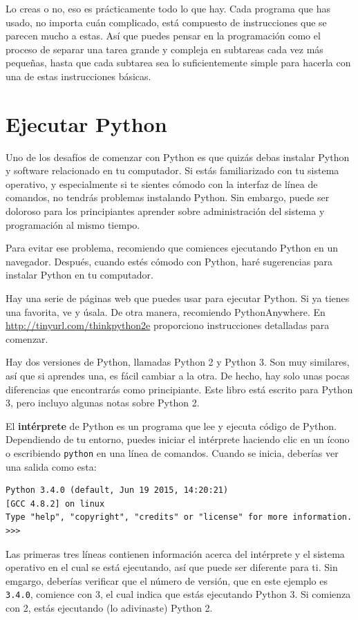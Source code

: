 \documentclass[10pt]{book}
\begin{document}
Lo creas o no, eso es prácticamente todo lo que hay.  Cada
programa que has usado, no importa cuán complicado, está compuesto de
instrucciones que se parecen mucho a estas.  Así que puedes pensar en
la programación como el proceso de separar una tarea grande y compleja en
subtareas cada vez más pequeñas, hasta que cada subtarea sea lo suficientemente
simple para hacerla con una de estas instrucciones básicas.


\section{Ejecutar Python}

Uno de los desafíos de comenzar con Python es que quizás debas
instalar Python y software relacionado en tu computador.
Si estás familiarizado con tu sistema operativo, y especialmente
si te sientes cómodo con la interfaz de línea de comandos, no tendrás
problemas instalando Python.  Sin embargo, puede ser doloroso para
los principiantes aprender sobre administración del sistema y programación al
mismo tiempo.

Para evitar ese problema, recomiendo que comiences ejecutando Python
en un navegador.  Después, cuando estés cómodo con Python, haré
sugerencias para instalar Python en tu computador.

Hay una serie de páginas web que puedes usar para ejecutar Python.  Si ya
tienes una favorita, ve y úsala.  De otra manera, recomiendo
PythonAnywhere.  En \url{http://tinyurl.com/thinkpython2e}
proporciono instrucciones detalladas para comenzar.

Hay dos versiones de Python, llamadas Python 2 y Python 3.
Son muy similares, así que si aprendes una, es fácil cambiar
a la otra.  De hecho, hay solo unas pocas diferencias que encontrarás
como principiante.
Este libro está escrito para Python 3, pero incluyo algunas notas
sobre Python 2.

El {\bf intérprete} de Python es un programa que lee y ejecuta
código de Python.  Dependiendo de tu entorno, puedes iniciar el intérprete
haciendo clic en un ícono o escribiendo {\tt python} en una
línea de comandos.
Cuando se inicia, deberías ver una salida como esta:

\begin{verbatim}
Python 3.4.0 (default, Jun 19 2015, 14:20:21)
[GCC 4.8.2] on linux
Type "help", "copyright", "credits" or "license" for more information.
>>>
\end{verbatim}
%
Las primeras tres líneas contienen información acerca del intérprete
y el sistema operativo en el cual se está ejecutando, así que puede ser
diferente para ti.  Sin emgargo, deberías verificar que el número de versión, que
en este ejemplo es {\tt 3.4.0}, comience con 3, el cual indica que estás
ejecutando Python 3.  Si comienza con 2, estás ejecutando
(lo adivinaste) Python 2.
\end{document}
